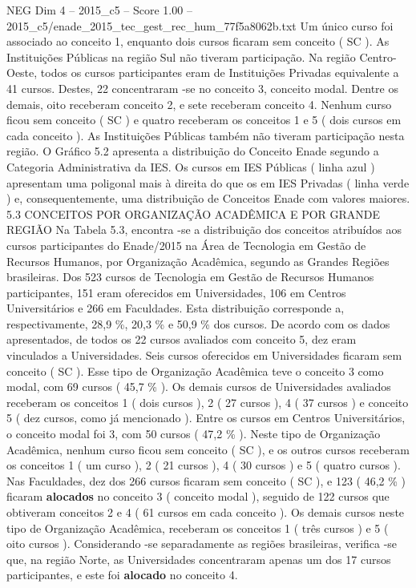 \begin{textsample}{NEG Dim 4 – 2015\_c5 – Score 1.00 – 2015\_c5/enade\_2015\_tec\_gest\_rec\_hum\_77f5a8062b.txt}
Um único curso foi associado ao conceito 1, enquanto dois cursos ficaram sem conceito ( SC ).
As Instituições Públicas na região Sul não tiveram participação.
Na região Centro-Oeste, todos os cursos participantes eram de Instituições Privadas equivalente a 41 cursos.
Destes, 22 concentraram -se no conceito 3, conceito modal.
Dentre os demais, oito receberam conceito 2, e sete receberam conceito 4.
Nenhum curso ficou sem conceito ( SC ) e quatro receberam os conceitos 1 e 5 ( dois cursos em cada conceito ).
As Instituições Públicas também não tiveram participação nesta região.
O Gráfico 5.2 apresenta a distribuição do Conceito Enade segundo a Categoria Administrativa da IES.
Os cursos em IES Públicas ( linha azul ) apresentam uma poligonal mais à direita do que os em IES Privadas ( linha verde ) e, consequentemente, uma distribuição de Conceitos Enade com valores maiores. 5.3 CONCEITOS POR ORGANIZAÇÃO ACADÊMICA E POR GRANDE REGIÃO Na Tabela 5.3, encontra -se a distribuição dos conceitos atribuídos aos cursos participantes do Enade/2015 na Área de Tecnologia em Gestão de Recursos Humanos, por Organização Acadêmica, segundo as Grandes Regiões brasileiras.
Dos 523 cursos de Tecnologia em Gestão de Recursos Humanos participantes, 151 eram oferecidos em Universidades, 106 em Centros Universitários e 266 em Faculdades.
Esta distribuição corresponde a, respectivamente, 28,9 \%, 20,3 \% e 50,9 \% dos cursos.
De acordo com os dados apresentados, de todos os 22 cursos avaliados com conceito 5, dez eram vinculados a Universidades.
Seis cursos oferecidos em Universidades ficaram sem conceito ( SC ).
Esse tipo de Organização Acadêmica teve o conceito 3 como modal, com 69 cursos ( 45,7 \% ).
Os demais cursos de Universidades avaliados receberam os conceitos 1 ( dois cursos ), 2 ( 27 cursos ), 4 ( 37 cursos ) e conceito 5 ( dez cursos, como já mencionado ).
Entre os cursos em Centros Universitários, o conceito modal foi 3, com 50 cursos ( 47,2 \% ).
Neste tipo de Organização Acadêmica, nenhum curso ficou sem conceito ( SC ), e os outros cursos receberam os conceitos 1 ( um curso ), 2 ( 21 cursos ), 4 ( 30 cursos ) e 5 ( quatro cursos ).
Nas Faculdades, dez dos 266 cursos ficaram sem conceito ( SC ), e 123 ( 46,2 \% ) ficaram \textbf{alocados} no conceito 3 ( conceito modal ), seguido de 122 cursos que obtiveram conceitos 2 e 4 ( 61 cursos em cada conceito ).
Os demais cursos neste tipo de Organização Acadêmica, receberam os conceitos 1 ( três cursos ) e 5 ( oito cursos ).
Considerando -se separadamente as regiões brasileiras, verifica -se que, na região Norte, as Universidades concentraram apenas um dos 17 cursos participantes, e este foi \textbf{alocado} no conceito 4.

\end{textsample}
